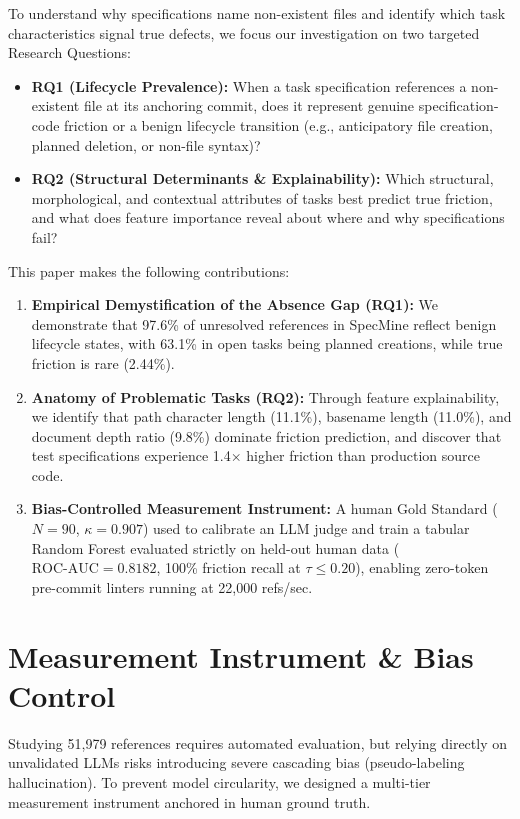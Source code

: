 \documentclass[10pt,conference]{IEEEtran}
\begin{document}
To understand why specifications name non-existent files and identify which task characteristics signal true defects, we focus our investigation on two targeted Research Questions:
\begin{itemize}
    \item \textbf{RQ1 (Lifecycle Prevalence):} When a task specification references a non-existent file at its anchoring commit, does it represent genuine specification-code friction or a benign lifecycle transition (e.g., anticipatory file creation, planned deletion, or non-file syntax)?
    \item \textbf{RQ2 (Structural Determinants \& Explainability):} Which structural, morphological, and contextual attributes of tasks best predict true friction, and what does feature importance reveal about where and why specifications fail?
\end{itemize}

This paper makes the following contributions:
\begin{enumerate}
    \item \textbf{Empirical Demystification of the Absence Gap (RQ1):} We demonstrate that 97.6\% of unresolved references in SpecMine reflect benign lifecycle states, with 63.1\% in open tasks being planned creations, while true friction is rare (2.44\%).
    \item \textbf{Anatomy of Problematic Tasks (RQ2):} Through feature explainability, we identify that path character length (11.1\%), basename length (11.0\%), and document depth ratio (9.8\%) dominate friction prediction, and discover that test specifications experience 1.4$\times$ higher friction than production source code.
    \item \textbf{Bias-Controlled Measurement Instrument:} A human Gold Standard ($N=90$, $\kappa = 0.907$) used to calibrate an LLM judge and train a tabular Random Forest evaluated strictly on held-out human data ($\text{ROC-AUC} = 0.8182$, 100\% friction recall at $\tau \le 0.20$), enabling zero-token pre-commit linters running at 22,000 refs/sec.
\end{enumerate}

\section{Measurement Instrument \& Bias Control}
\label{sec:methodology}

Studying 51,979 references requires automated evaluation, but relying directly on unvalidated LLMs risks introducing severe cascading bias (pseudo-labeling hallucination). To prevent model circularity, we designed a multi-tier measurement instrument anchored in human ground truth.
\end{document}
